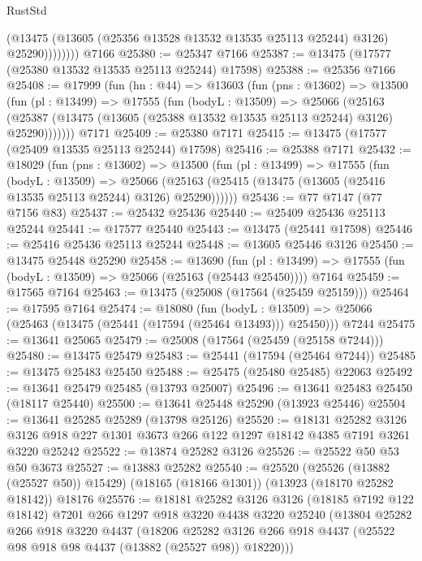 \begin{lexlean}{RustStd}
\begin{coremodule}
                  (@13475 (@13605 (@25356 @13528 @13532 @13535 @25113 @25244) @3126) @25290))))))))
    @7166
@25380 := @25347 @7166
@25387 := @13475 (@17577 (@25380 @13532 @13535 @25113 @25244) @17598)
@25388 := @25356 @7166
@25408 := @17999
    (fun (hn : @44) =>
    @13603
      (fun (pns : @13602) =>
      @13500
        (fun (pl : @13499) =>
        @17555
          (fun (bodyL : @13509) =>
          @25066
            (@25163
              (@25387 (@13475 (@13605 (@25388 @13532 @13535 @25113 @25244) @3126) @25290)))))))
    @7171
@25409 := @25380 @7171
@25415 := @13475 (@17577 (@25409 @13535 @25113 @25244) @17598)
@25416 := @25388 @7171
@25432 := @18029
    (fun (pns : @13602) =>
    @13500
      (fun (pl : @13499) =>
      @17555
        (fun (bodyL : @13509) =>
        @25066 (@25163 (@25415 (@13475 (@13605 (@25416 @13535 @25113 @25244) @3126) @25290))))))
@25436 := @77 @7147 (@77 @7156 @83)
@25437 := @25432 @25436
@25440 := @25409 @25436 @25113 @25244
@25441 := @17577 @25440
@25443 := @13475 (@25441 @17598)
@25446 := @25416 @25436 @25113 @25244
@25448 := @13605 @25446 @3126
@25450 := @13475 @25448 @25290
@25458 := @13690
    (fun (pl : @13499) => @17555 (fun (bodyL : @13509) => @25066 (@25163 (@25443 @25450))))
    @7164
@25459 := @17565 @7164
@25463 := @13475 (@25008 (@17564 (@25459 @25159)))
@25464 := @17595 @7164
@25474 := @18080
    (fun (bodyL : @13509) => @25066 (@25463 (@13475 (@25441 (@17594 (@25464 @13493))) @25450)))
    @7244
@25475 := @13641 @25065
@25479 := @25008 (@17564 (@25459 (@25158 @7244)))
@25480 := @13475 @25479
@25483 := @25441 (@17594 (@25464 @7244))
@25485 := @13475 @25483 @25450
@25488 := @25475 (@25480 @25485) @22063
@25492 := @13641 @25479 @25485 (@13793 @25007)
@25496 := @13641 @25483 @25450 (@18117 @25440)
@25500 := @13641 @25448 @25290 (@13923 @25446)
@25504 := @13641 @25285 @25289 (@13798 @25126)
@25520 := @18131
    @25282
    @3126
    @3126
    @918
    @227
    @1301
    @3673
    @266
    @122
    @1297
    @18142
    @4385
    @7191
    @3261
    @3220
    @25242
@25522 := @13874 @25282 @3126
@25526 := @25522 @50 @53 @50 @3673
@25527 := @13883 @25282
@25540 := @25520
    (@25526 (@13882 (@25527 @50)) @15429)
    (@18165 (@18166 @1301))
    (@13923 (@18170 @25282 @18142))
    @18176
@25576 := @18181
    @25282
    @3126
    @3126
    (@18185 @7192 @122 @18142)
    @7201
    @266
    @1297
    @918
    @3220
    @4438
    @3220
    @25240
    (@13804
      @25282
      @266
      @918
      @3220
      @4437
      (@18206
        @25282
        @3126
        @266
        @918
        @4437
        (@25522 @98 @918 @98 @4437 (@13882 (@25527 @98)) @18220)))

\end{coremodule}
\end{lexlean}
